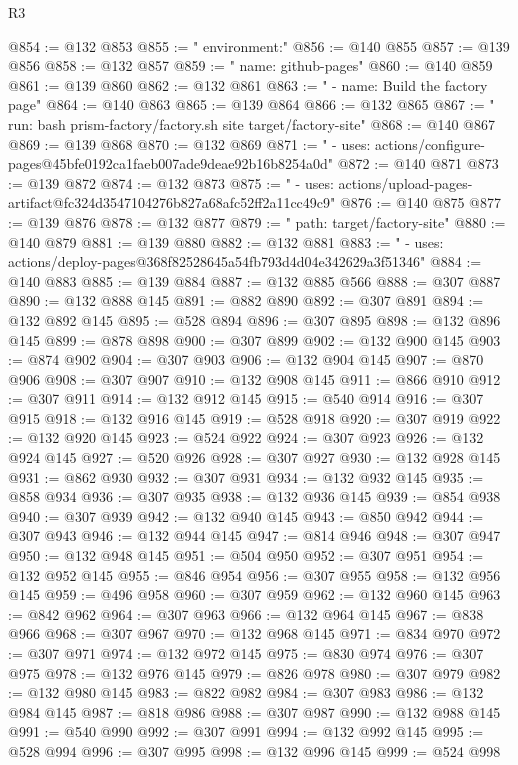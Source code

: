 \begin{lexlean}{R3}
\begin{coremodule}
@854 := @132 @853
@855 := "    environment:"
@856 := @140 @855
@857 := @139 @856
@858 := @132 @857
@859 := "      name: github-pages"
@860 := @140 @859
@861 := @139 @860
@862 := @132 @861
@863 := "      - name: Build the factory page"
@864 := @140 @863
@865 := @139 @864
@866 := @132 @865
@867 := "        run: bash prism-factory/factory.sh site target/factory-site"
@868 := @140 @867
@869 := @139 @868
@870 := @132 @869
@871 := "      - uses: actions/configure-pages@45bfe0192ca1faeb007ade9deae92b16b8254a0d"
@872 := @140 @871
@873 := @139 @872
@874 := @132 @873
@875 := "      - uses: actions/upload-pages-artifact@fc324d3547104276b827a68afc52ff2a11cc49c9"
@876 := @140 @875
@877 := @139 @876
@878 := @132 @877
@879 := "          path: target/factory-site"
@880 := @140 @879
@881 := @139 @880
@882 := @132 @881
@883 := "      - uses: actions/deploy-pages@368f82528645a54fb793d4d04e342629a3f51346"
@884 := @140 @883
@885 := @139 @884
@887 := @132 @885 @566
@888 := @307 @887
@890 := @132 @888 @145
@891 := @882 @890
@892 := @307 @891
@894 := @132 @892 @145
@895 := @528 @894
@896 := @307 @895
@898 := @132 @896 @145
@899 := @878 @898
@900 := @307 @899
@902 := @132 @900 @145
@903 := @874 @902
@904 := @307 @903
@906 := @132 @904 @145
@907 := @870 @906
@908 := @307 @907
@910 := @132 @908 @145
@911 := @866 @910
@912 := @307 @911
@914 := @132 @912 @145
@915 := @540 @914
@916 := @307 @915
@918 := @132 @916 @145
@919 := @528 @918
@920 := @307 @919
@922 := @132 @920 @145
@923 := @524 @922
@924 := @307 @923
@926 := @132 @924 @145
@927 := @520 @926
@928 := @307 @927
@930 := @132 @928 @145
@931 := @862 @930
@932 := @307 @931
@934 := @132 @932 @145
@935 := @858 @934
@936 := @307 @935
@938 := @132 @936 @145
@939 := @854 @938
@940 := @307 @939
@942 := @132 @940 @145
@943 := @850 @942
@944 := @307 @943
@946 := @132 @944 @145
@947 := @814 @946
@948 := @307 @947
@950 := @132 @948 @145
@951 := @504 @950
@952 := @307 @951
@954 := @132 @952 @145
@955 := @846 @954
@956 := @307 @955
@958 := @132 @956 @145
@959 := @496 @958
@960 := @307 @959
@962 := @132 @960 @145
@963 := @842 @962
@964 := @307 @963
@966 := @132 @964 @145
@967 := @838 @966
@968 := @307 @967
@970 := @132 @968 @145
@971 := @834 @970
@972 := @307 @971
@974 := @132 @972 @145
@975 := @830 @974
@976 := @307 @975
@978 := @132 @976 @145
@979 := @826 @978
@980 := @307 @979
@982 := @132 @980 @145
@983 := @822 @982
@984 := @307 @983
@986 := @132 @984 @145
@987 := @818 @986
@988 := @307 @987
@990 := @132 @988 @145
@991 := @540 @990
@992 := @307 @991
@994 := @132 @992 @145
@995 := @528 @994
@996 := @307 @995
@998 := @132 @996 @145
@999 := @524 @998

\end{coremodule}
\end{lexlean}
